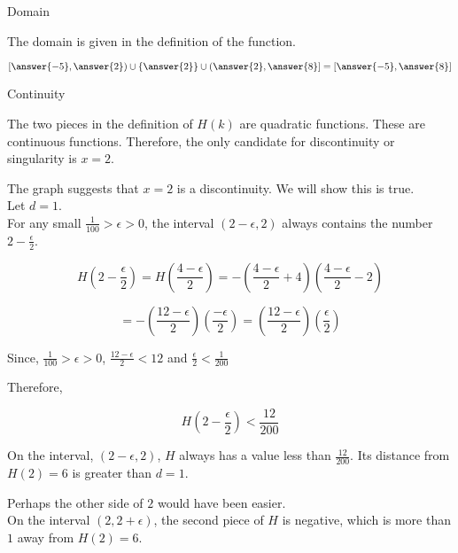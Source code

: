 \documentclass{ximera}
\begin{document}
\begin{exercise}
\begin{question} Domain


The domain is given in the definition of the function.

\[
\left[ \answer{-5}, \answer{2} \right) \cup \left\{ \answer{2} \right\} \cup \left(  \answer{2}, \answer{8} \right] = \left[ \answer{-5}, \answer{8} \right]
\]


\end{question}







\begin{question} Continuity


The two pieces in the definition of $H(k)$ are quadratic functions.  These are continuous functions.  Therefore, the only candidate for discontinuity or singularity is $x = 2$.

The graph suggests that $x = 2$ is a discontinuity. We will show this is true. \\

Let $d = 1$. \\

For any small $\frac{1}{100} > \epsilon > 0$, the interval $(2 - \epsilon, 2)$ always contains the number $2 - \frac{\epsilon}{2}$.  


\[
H\left( 2 - \frac{\epsilon}{2} \right) = H\left( \frac{4 - \epsilon}{2} \right) = -\left( \frac{4 - \epsilon}{2} + 4 \right) \left(  \frac{4 - \epsilon}{2} - 2 \right)
\]

\[
= -\left( \frac{12 - \epsilon}{2} \right) \left(  \frac{- \epsilon}{2} \right) = \left( \frac{12 - \epsilon}{2} \right) \left(  \frac{\epsilon}{2} \right)
\]


Since, $\frac{1}{100} > \epsilon > 0$, $\frac{12 - \epsilon}{2} < 12$ and $\frac{\epsilon}{2} < \frac{1}{200}$


Therefore, 

\[
H\left( 2 - \frac{\epsilon}{2} \right) < \frac{12}{200} 
\]



On the interval, $(2 - \epsilon, 2)$, $H$ always has a value less than $\frac{12}{200}$.  Its distance from $H(2) = 6$ is greater than $d = 1$.



Perhaps the other side of $2$ would have been easier. \\

On the interval $(2, 2 + \epsilon)$, the second piece of $H$ is negative, which is more than $1$ away from $H(2) = 6$. \\



\end{question}
\end{exercise}
\end{document}
